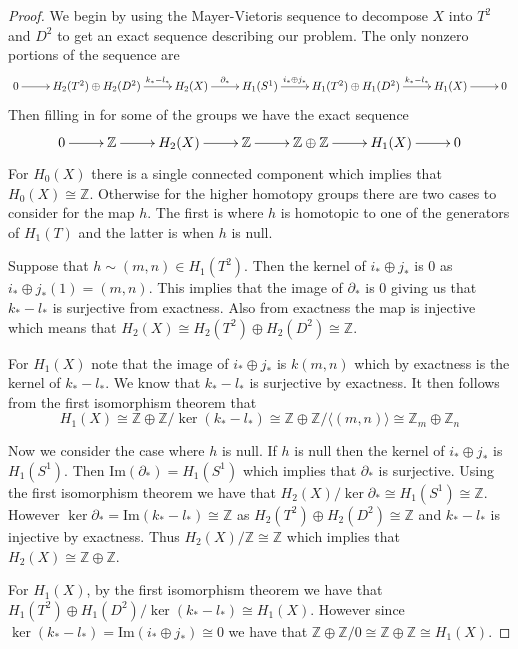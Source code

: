 \documentclass[10pt]{article}
\newcommand{\bb}[1]{\mathbb{#1}}
\theoremstyle{plain}
\theoremstyle{remark}
\begin{document}
\begin{proof}
  We begin by using the Mayer-Vietoris sequence to decompose $X$ into $T^2$ and $D^2$
  to get an exact sequence describing our problem. The only nonzero portions of
  the sequence are
  \[
    \xymatrix{
      0 \ar[r] & H_2(T^2)\oplus H_2(D^2) \ar[r]^-{k_*-l_*} & H_2(X) \ar[r]^-{\partial_*} &
      H_1(S^1) \ar[r]^-{i_*\oplus j_*} & H_1(T^2)\oplus H_1(D^2) \ar[r]^-{k_*-l_*} & H_1(X) \ar[r] & 0\\
    }
  \]
  Then filling in for some of the groups we have the exact sequence
  \[
    \xymatrix{
      0 \ar[r] & \bb{Z} \ar[r] & H_2(X) \ar[r] & \bb{Z} \ar[r]
      &\bb{Z}\oplus\bb{Z}\ar[r] & H_1(X)\ar[r] & 0
    }
  \]
  For $H_0(X)$ there is a single connected component which implies that
  $H_0(X)\cong \bb{Z}$. Otherwise for the higher homotopy groups there are two
  cases to consider for the map $h$. The first is where $h$
  is homotopic to one of the generators of $H_1(T)$ and the latter is when $h$
  is null.

  Suppose that $h\sim (m,n)\in H_1(T^2)$. Then the kernel of $i_*\oplus j_*$ is 0 as
  $i_*\oplus j_*(1)=(m,n)$. This implies that the image of $\partial_*$ is 0 giving us
  that $k_*-l_*$ is surjective from exactness. Also from exactness the map
  is injective which means that $H_2(X)\cong H_2(T^2)\oplus H_2(D^2)\cong\bb{Z}$.

  For $H_1(X)$ note that the image of $i_*\oplus j_*$ is $k(m,n)$ which by exactness
  is the kernel of $k_*-l_*$. We know that $k_*-l_*$ is surjective by exactness.
  It then follows from the first isomorphism theorem that
  \[H_1(X)\cong\bb{Z}\oplus\bb{Z}/\ker(k_*-l_*)\cong\bb{Z}\oplus\bb{Z}/\langle(m,n)\rangle\cong\bb{Z}_m\oplus\bb{Z}_n\]

  Now we consider the case where $h$ is null. If $h$ is null then the kernel
  of $i_*\oplus j_*$ is $H_1(S^1)$. Then $\mathrm{Im}(\partial_*)=H_1(S^1)$ which implies that
  $\partial_*$ is surjective. Using the first isomorphism theorem we have that
  $H_2(X)/\ker \partial_* \cong H_1(S^1)\cong \bb{Z}$. However $\ker\partial_*=\mathrm{Im}(k_*-l_*)\cong \bb{Z}$
  as $H_2(T^2)\oplus H_2(D^2)\cong \bb{Z}$ and $k_*-l_*$ is injective by exactness. Thus
  $H_2(X)/\bb{Z}\cong\bb{Z}$ which implies that $H_2(X)\cong \bb{Z}\oplus\bb{Z}$.

  For $H_1(X)$, by the first isomorphism theorem we have that
  $H_1(T^2)\oplus H_1(D^2)/\ker(k_*-l_*)\cong H_1(X)$. However since
  $\ker(k_*-l_*)=\mathrm{Im}(i_*\oplus j_*)\cong 0$ we have that
  $\bb{Z}\oplus\bb{Z}/0\cong \bb{Z}\oplus\bb{Z}\cong H_1(X)$.


\end{proof}
\end{document}
